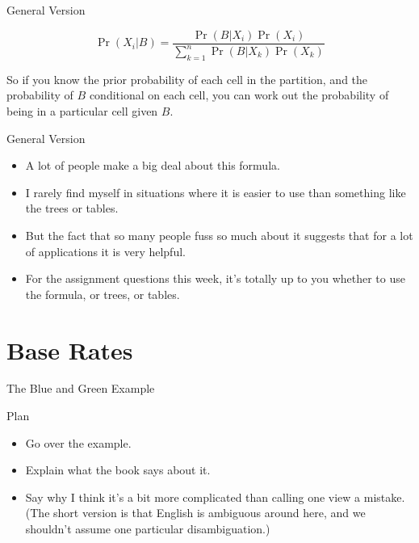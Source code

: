 \documentclass[
  ignorenonframetext,
]{beamer}
\providecommand{\tightlist}{%
  \setlength{\itemsep}{0pt}\setlength{\parskip}{0pt}}
\renewcommand{\,}{\text{, }}
\begin{document}
\begin{frame}{General Version}
\protect\hypertarget{general-version-1}{}

\[
\Pr(X_i | B) = \frac{\Pr(B | X_i)\Pr(X_i)}{\sum_{k=1}^n \Pr(B | X_k)\Pr(X_k)}
\]

So if you know the prior probability of each cell in the partition, and
the probability of \(B\) conditional on each cell, you can work out the
probability of being in a particular cell given \(B\).

\end{frame}

\begin{frame}{General Version}
\protect\hypertarget{general-version-2}{}

\begin{itemize}
\tightlist
\item
  A lot of people make a big deal about this formula.
\item
  I rarely find myself in situations where it is easier to use than
  something like the trees or tables.
\item
  But the fact that so many people fuss so much about it suggests that
  for a lot of applications it is very helpful.
\item
  For the assignment questions this week, it's totally up to you whether
  to use the formula, or trees, or tables.
\end{itemize}

\end{frame}

\hypertarget{base-rates}{%
\section{Base Rates}\label{base-rates}}

\begin{frame}{The Blue and Green Example}
\protect\hypertarget{the-blue-and-green-example}{}

Plan

\begin{itemize}
\tightlist
\item
  Go over the example.
\item
  Explain what the book says about it.
\item
  Say why I think it's a bit more complicated than calling one view a
  mistake. (The short version is that English is ambiguous around here,
  and we shouldn't assume one particular disambiguation.)
\end{itemize}

\end{frame}
\end{document}
